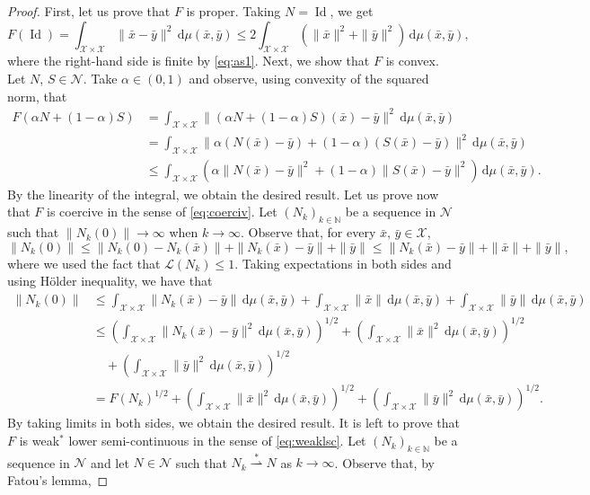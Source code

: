 \documentclass[onefignum,onetabnum]{siamonline250211}
\newcommand{\Id}{\operatorname{Id}}
\newcommand{\N}{\mathcal{N}}
\newcommand{\weakk}{\stackrel{\ast}{\rightharpoonup}}
\newcommand{\cL}{\mathcal{L}}
\newcommand{\cX}{\mathcal{X}}
\begin{document}
\begin{proof} 
First, let us prove that $F$ is proper. Taking $N=\Id$, we get
$$
F(\Id)=\int_{\cX\times\cX} \|\bar x-\bar y\|^2 \, \mathrm{d}\mu(\bar x, \bar y)\leq 2\int_{\cX\times\cX} \left(\|\bar x\|^2+\|\bar y\|^2\right) \, \mathrm{d}\mu(\bar x, \bar y),
$$
where the right-hand side is finite by \cref{eq:as1}. Next, we show that $F$ is convex. Let $N$, $S\in\N$. Take $\alpha\in(0,1)$ and observe, using convexity of the squared norm, that
\begin{align*}
    F(\alpha N+ (1-\alpha)S)&=\int_{\cX\times\cX} \|(\alpha N+(1-\alpha)S)(\bar{x})-\bar{y}\|^2 \, \mathrm{d}\mu(\bar x, \bar y)\\
    &=\int_{\cX\times\cX} \|\alpha(N(\bar{x})-\bar{y})+(1-\alpha)(S(\bar{x})-\bar{y})\|^2 \, \mathrm{d}\mu(\bar x, \bar y)\\
    &\leq \int_{\cX\times\cX} \left(\alpha\|N(\bar{x})-\bar{y}\|^2+(1-\alpha)\|S(\bar{x})-\bar{y}\|^2\right) \, \mathrm{d}\mu(\bar x, \bar y).
\end{align*}
By the linearity of the integral, we obtain the desired result. Let us prove now that $F$ is coercive in the sense of \cref{eq:coerciv}. Let $(N_k)_{k\in\mathbb{N}}$ be a sequence in $\N$ such that $\|N_k(0)\|\to\infty$ when $k\to\infty$. Observe that, for every $\bar x, \, \bar y\in\cX$,
$$
\|N_k(0)\|\leq \|N_k(0)-N_k(\bar x)\| + \|N_k(\bar x)-\bar y\|+\|\bar y\|\leq \|N_k(\bar x)-\bar y\| + \|\bar x\| + \|\bar y\|,
$$
where we used the fact that $\cL(N_k)\leq 1$. Taking expectations in both sides and using H\"older inequality, we have that
$$
\begin{aligned}
\|N_k(0)\|&\leq \int_{\cX\times\cX} \|N_k(\bar x)-\bar y\| \, \mathrm{d}\mu(\bar x, \bar y)+\int_{\cX\times\cX} \|\bar x\| \, \mathrm{d}\mu(\bar x, \bar y)+ \int_{\cX\times\cX} \|\bar y\| \, \mathrm{d}\mu(\bar x, \bar y)\\
&\leq \left(\int_{\cX\times\cX} \|N_k(\bar x)-\bar y\|^2 \, \mathrm{d}\mu(\bar x, \bar y)\right)^{1/2}+ \left(\int_{\cX\times\cX} \|\bar x\|^2 \, \mathrm{d}\mu(\bar x, \bar y)\right)^{1/2}\\
&\quad+ \left(\int_{\cX\times\cX} \|\bar y\|^2 \, \mathrm{d}\mu(\bar x, \bar y)\right)^{1/2}\\
&= F(N_k)^{1/2} + \left(\int_{\cX\times\cX} \|\bar x\|^2 \, \mathrm{d}\mu(\bar x, \bar y)\right)^{1/2}+ \left(\int_{\cX\times\cX} \|\bar y\|^2 \, \mathrm{d}\mu(\bar x, \bar y)\right)^{1/2}.
\end{aligned}
$$
By taking limits in both sides, we obtain the desired result. It is left to prove that $F$ is weak$^*$ lower semi-continuous in the sense of \cref{eq:weaklsc}. Let $(N_k)_{k\in\mathbb{N}}$ be a sequence in $\N$ and let $N\in \N$ such that $N_k\weakk N$ as $k\to\infty$. Observe that, by Fatou's lemma,

\end{proof}
\end{document}
